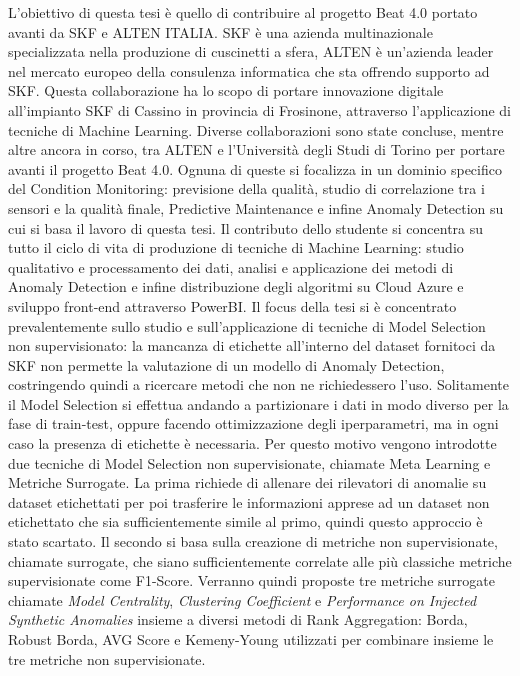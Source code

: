 L’obiettivo di questa tesi è quello di contribuire al progetto Beat 4.0 portato avanti da SKF e ALTEN ITALIA. SKF è una azienda multinazionale specializzata nella produzione di cuscinetti a sfera, ALTEN è un'azienda leader nel mercato europeo della consulenza informatica che sta offrendo supporto ad SKF. Questa collaborazione ha lo scopo di portare innovazione digitale all'impianto SKF di Cassino in provincia di Frosinone, attraverso l'applicazione di tecniche di Machine Learning.
Diverse collaborazioni sono state concluse\cite{mnardo, jnicolosi}, mentre altre ancora in corso, tra ALTEN e l'Università degli Studi di Torino per portare avanti il progetto Beat 4.0. Ognuna di queste si focalizza in un dominio specifico del Condition Monitoring: previsione della qualità, studio di correlazione tra i sensori e la qualità finale, Predictive Maintenance e infine Anomaly Detection su cui si basa il lavoro di questa tesi.
Il contributo dello studente si concentra su tutto il ciclo di vita di produzione di tecniche di Machine Learning: studio qualitativo e processamento dei dati, analisi e applicazione dei metodi di Anomaly Detection e infine distribuzione degli algoritmi su Cloud Azure e sviluppo front-end attraverso PowerBI.
Il focus della tesi si è concentrato prevalentemente sullo studio e sull'applicazione di tecniche di Model Selection non supervisionato: la mancanza di etichette all'interno del dataset fornitoci da SKF non permette la valutazione di un modello di Anomaly Detection, costringendo quindi a ricercare metodi che non ne richiedessero l'uso. Solitamente il Model Selection si effettua andando a partizionare i dati in modo diverso per la fase di train-test, oppure facendo ottimizzazione degli iperparametri, ma in ogni caso la presenza di etichette è necessaria. Per questo motivo vengono introdotte due tecniche di Model Selection non supervisionate, chiamate Meta Learning\cite{https://doi.org/10.48550/arxiv.2211.01834} e Metriche Surrogate\cite{https://doi.org/10.48550/arxiv.2210.01078}. La prima richiede di allenare dei rilevatori di anomalie su dataset etichettati per poi trasferire le informazioni apprese ad un dataset non etichettato che sia sufficientemente simile al primo, quindi questo approccio è stato scartato. Il secondo si basa sulla creazione di metriche non supervisionate, chiamate surrogate, che siano sufficientemente correlate alle più classiche metriche supervisionate come F1-Score. Verranno quindi proposte tre metriche surrogate chiamate \textit{Model Centrality}, \textit{Clustering Coefficient} e \textit{Performance on Injected Synthetic Anomalies} insieme a diversi metodi di Rank Aggregation: Borda, Robust Borda, AVG Score e Kemeny-Young utilizzati per combinare insieme le tre metriche non supervisionate.

